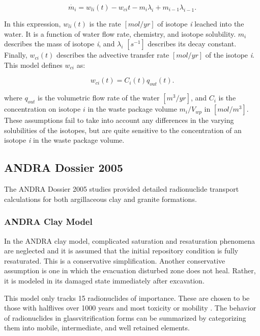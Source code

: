 {\begin{equation}
\dot{m_i}=w_{li}(t)-w_{ci}{t}-m_i\lambda_i+m_{i-1}\lambda_{i-1}.\nonumber
\end{equation}

In this expression, $w_{li}(t)$ is the rate $[mol/yr]$ of isotope \emph{i}
leached into the water.  It is a function of water flow rate, chemistry, and
isotope solubility. $m_i$ describes the mass of isotope \emph{i}, and
$\lambda_i$ $[s^{-1}]$ describes its decay constant. Finally, $w_{ci}(t)$
describes the advective transfer rate $[mol/yr]$ of the isotope \emph{i}. This 
model defines $w_{ci}$ as:

\begin{equation}
  w_{ci}(t)=C_i(t)q_{out}(t). 
\end{equation}

where $q_{out}$ is the volumetric flow rate of the water $[m^3/yr]$, and 
$C_i$ is the concentration on isotope $i$ in the waste package volume 
$m_i/V_{wp}$ in $[mol/m^3]$. These assumptions fail to take into account any
differences in the varying solubilities of the isotopes, but are quite
sensitive to the concentration of an isotope \emph{i} in the waste package
volume.  

\subsection{ANDRA Dossier 2005} The ANDRA Dossier 2005 studies provided
detailed radionuclide transport calculations for both argillaceous clay and granite
formations. 

\subsubsection{ANDRA Clay Model} 

In the \gls{ANDRA} clay model, complicated saturation and resaturation phenomena 
are neglected and it is assumed that the initial repository condition is fully
resaturated. This is a conservative simplification. Another conservative
assumption is one in which the evacuation disturbed zone does not heal. Rather,
it is modeled in its damaged state immediately after excavation. 

This model only tracks 15 radionuclides of importance.  These are chosen to be those
with halflives over 1000 years and most toxicity or mobility
\cite{andra_argile:_2005}. The behavior of radionuclides in 
glassvitrification forms can be summarized by categorizing them into mobile,
intermediate, and well retained elements. 

}
